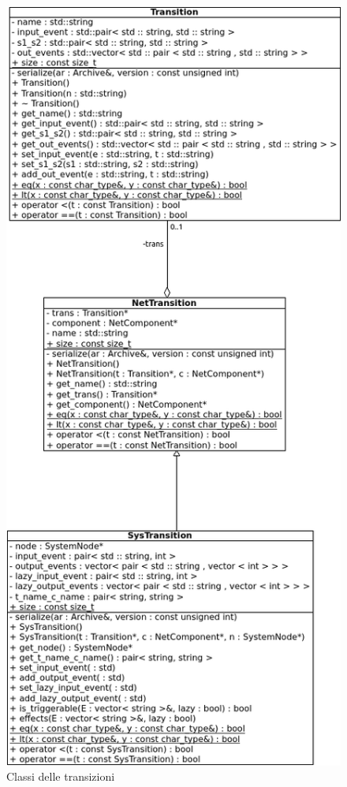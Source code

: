 \begin{figure}[htbp]
\centering
\includegraphics[scale=0.6]{./Img/implementazione/trans.png}
\caption{Classi delle transizioni}
\label{fig:trans}
\end{figure}


